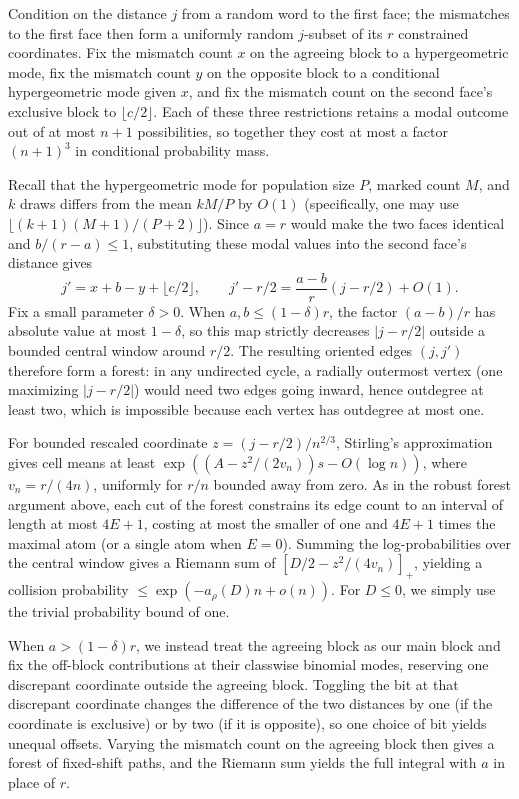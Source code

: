 Condition on the distance $j$ from a random word to the first face; the mismatches to the first face then form a uniformly random $j$-subset of its $r$ constrained coordinates. Fix the mismatch count $x$ on the agreeing block to a hypergeometric mode, fix the mismatch count $y$ on the opposite block to a conditional hypergeometric mode given $x$, and fix the mismatch count on the second face's exclusive block to $\lfloor c/2\rfloor$. Each of these three restrictions retains a modal outcome out of at most $n+1$ possibilities, so together they cost at most a factor $(n+1)^3$ in conditional probability mass.

Recall that the hypergeometric mode for population size $P$, marked count $M$, and $k$ draws differs from the mean $kM/P$ by $O(1)$ (specifically, one may use $\lfloor(k+1)(M+1)/(P+2)\rfloor$). Since $a=r$ would make the two faces identical and $b/(r-a)\le1$, substituting these modal values into the second face's distance gives
\[
 j'=x+b-y+\lfloor c/2\rfloor,\qquad
 j'-r/2=\frac{a-b}{r}(j-r/2)+O(1).
\]
Fix a small parameter $\delta>0$. When $a,b\le(1-\delta)r$, the factor $(a-b)/r$ has absolute value at most $1-\delta$, so this map strictly decreases $|j-r/2|$ outside a bounded central window around $r/2$. The resulting oriented edges $(j,j')$ therefore form a forest: in any undirected cycle, a radially outermost vertex (one maximizing $|j-r/2|$) would need two edges going inward, hence outdegree at least two, which is impossible because each vertex has outdegree at most one.

For bounded rescaled coordinate $z=(j-r/2)/n^{2/3}$, Stirling's approximation gives cell means at least $\exp((A-z^2/(2v_n))s-O(\log n))$, where $v_n=r/(4n)$, uniformly for $r/n$ bounded away from zero. As in the robust forest argument above, each cut of the forest constrains its edge count to an interval of length at most $4E+1$, costing at most the smaller of one and $4E+1$ times the maximal atom (or a single atom when $E=0$). Summing the log-probabilities over the central window gives a Riemann sum of $[D/2-z^2/(4v_n)]_+$, yielding a collision probability $\le\exp(-a_\rho(D)n+o(n))$. For $D\le0$, we simply use the trivial probability bound of one.

When $a>(1-\delta)r$, we instead treat the agreeing block as our main block and fix the off-block contributions at their classwise binomial modes, reserving one discrepant coordinate outside the agreeing block. Toggling the bit at that discrepant coordinate changes the difference of the two distances by one (if the coordinate is exclusive) or by two (if it is opposite), so one choice of bit yields unequal offsets. Varying the mismatch count on the agreeing block then gives a forest of fixed-shift paths, and the Riemann sum yields the full integral with $a$ in place of $r$.

